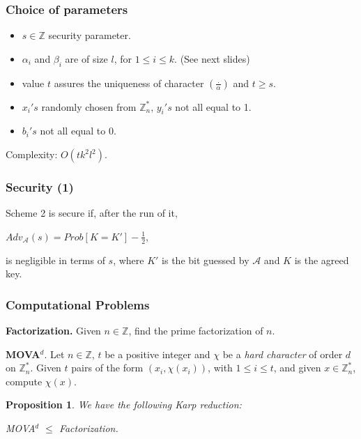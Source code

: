 \documentclass{beamer}
\newtheorem{proposition}{Proposition}
\begin{document}
\begin{frame}
\frametitle{Choice of parameters}

	\begin{itemize}
		\item $s \in \mathbb{Z}$ security parameter.
		\item $\alpha_i$ and $\beta_i$ are of size $l$, for $1 \leq i \leq k$. (See next slides)
		\item value $t$ assures the uniqueness of character $(\frac{.}{\alpha})$ and $t\geq s$. 
		\item $x_i's$ randomly chosen from $\mathbb{Z}_n^*$, $y_i's$ not all equal to 1.
		\item $b_i's$ not all equal to 0. 
	\end{itemize}

	\bigskip

 Complexity: $O(tk^2l^2)$.

\end{frame}


\begin{frame}
\frametitle{Security (1)}

	Scheme 2 is secure if, after the run of it,
			
	\hspace{10mm} $Adv_{\mathcal{A}}(s) = Prob [K = K'] - \frac{1}{2}$,  \\
	
	\bigskip
	
	is negligible in terms of $s$, where $K'$ is the bit guessed by $\mathcal{A}$ and $K$ is the agreed key. 
\end{frame}


\begin{frame}
\frametitle{Computational Problems}

	\textbf{Factorization.} Given $n \in \mathbb{Z}$, find the prime factorization of $n$.
 	
 	\bigskip	
 			
 	\textbf{MOVA$^d$}. Let $n \in \mathbb{Z}$, $t$ be a positive integer and $\chi$ be a \textit{hard character} of order $d$ on $\mathbb{Z}_n^*$. Given $t$ pairs of the form $(x_i, \chi(x_i))$, with $1 \leq i \leq t$, and given $x \in \mathbb{Z}_n^*$, compute $\chi(x)$. 
 	
 	\bigskip
 	
 	\begin{proposition}
 		We have the following Karp reduction:
 		 	
 		 	\hspace{30mm} 	MOVA$^d$ $\leq$ Factorization.	
 	\end{proposition}
 	 		
\end{frame}
\end{document}
